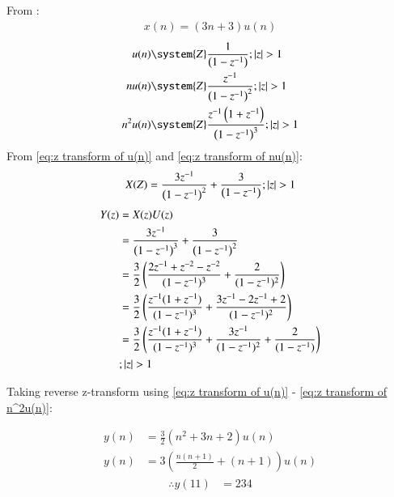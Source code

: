 \documentclass[journal,12pt,twocolumn]{IEEEtran}
\theoremstyle{remark}
\begin{document}
From :
\begin{align}
    x(n) = (3n+3)u(n)
\end{align}
    \begin{align}
             u(n) &\system{Z} \frac{1}{\brak{1-z^{-1}}} ;\abs{z}>1 \label{eq:z transform of u(n)} \\
        n u(n) &\system{Z} \frac{z^{-1}}{\brak{1-z^{-1}}^2} ; \abs{z}>1 \label{eq:z transform of nu(n)} \\
        n^2 u(n) &\system{Z} \frac{z^{-1}\brak{1+z^{-1}}}{\brak{1-z^{-1}}^3} ;\abs{z}>1\label{eq:z transform of n^2u(n)} 
    \end{align}
From \eqref{eq:z transform of u(n)} and \eqref{eq:z transform of nu(n)}:
\begin{align}
    X(Z) = \frac{3z^{-1}}{\left(1-z^{-1}\right)^2} + \frac{3}{\left(1-z^{-1}\right)} ;|z| > 1
\end{align}
\begin{align}
 Y(z) &= X(z)U(z)\\
  &= \frac{3z^{-1}}{\left(1-z^{-1}\right)^3} + \frac{3}{\left(1-z^{-1}\right)^2}\\
  &=\frac{3}{2}\left(\frac{2z^{-1} + z^{-2} - z^{-2}}{(1 - z^{-1})^3} + \frac{2}{(1 - z^{-1})^2}\right)\\
    &=\frac{3}{2}\left(\frac{z^{-1}(1 + z^{-1})}{(1 - z^{-1})^3} + \frac{3z^{-1} - 2z^{-1} + 2}{(1 - z^{-1})^2} \right)\\
&=\frac{3}{2}\left(\frac{z^{-1}(1 + z^{-1})}{(1 - z^{-1})^3} + \frac{3z^{-1}}{(1 - z^{-1})^2} + \frac{2}{(1 - z^{-1})}\right)\nonumber\\
&;|z| > 1 
    \end{align}


Taking reverse z-transform using \eqref{eq:z transform of u(n)} - \eqref{eq:z transform of n^2u(n)}: 

\begin{align}
    y(n) &= \frac{3}{2}\left(n^2 + 3n +2\right)u(n) \\
    y(n) &= 3\left(\frac{n(n + 1)}{2} + (n +1)\right)u(n)
\end{align}
\begin{align}
  \therefore  y(11) &=234
\end{align}
\end{document}
